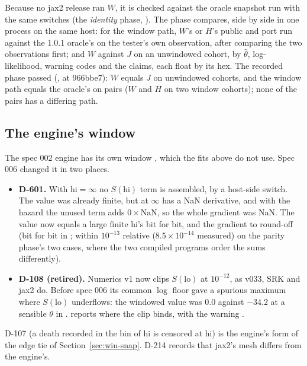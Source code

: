 Because no jax2 release ran $W$, it is checked against the oracle snapshot run with the same switches (the \emph{identity}
phase, ). The phase compares, side by side in one process on the same host: for the window
path, $W$'s or $H$'s public  and port run against the 1.0.1 oracle's  on the tester's own
observation, after comparing the two observations first; and $W$ against $J$ on an unwindowed cohort, by $\hat\theta$,
log-likelihood, warning codes and the claims, each float by its hex.
The recorded phase passed (, at 966bbe7): $W$ equals $J$ on 
unwindowed cohorts, and the window path equals the oracle's on  pairs ($W$ and $H$ on two
window cohorts); none of the  pairs has a differing path.

\subsection{The engine's window}\label{sec:win-engine}

The spec 002 engine has its own window , which the fits above do not use. Spec 006 changed it
in two places.
\begin{itemize}[nosep]
  \item \textbf{D-601.} With $\mathrm{hi}=\infty$ no $S(\mathrm{hi})$ term is assembled, by a host-side switch. The value
    was already finite, but  at $\infty$ has a NaN derivative, and with the hazard the unused term adds
    $0\times\mathrm{NaN}$, so the whole gradient was NaN. The value now equals a large finite hi's bit for bit, and the gradient to round-off
    (bit for bit in ; within $10^{-13}$ relative ($8.5\times10^{-14}$ measured) on the parity phase's two cases,
    where the two compiled programs order the sums differently).
  \item \textbf{D-108 (retired).} Numerics v1 now clips $S(\mathrm{lo})$ at $10^{-12}$, as v033, SRK and jax2 do. Before
    spec 006 its common $\log$ floor gave a spurious maximum where $S(\mathrm{lo})$ underflows: the windowed value was
    $0.0$ against $-34.2$ at a sensible $\theta$ in .
     reports where the clip binds, with the warning 
    .
\end{itemize}
D-107 (a death recorded in the bin of hi is censored at hi) is the engine's form of the edge tie of
Section~\ref{sec:win-snap}. D-214 records that jax2's mesh differs from the engine's.


